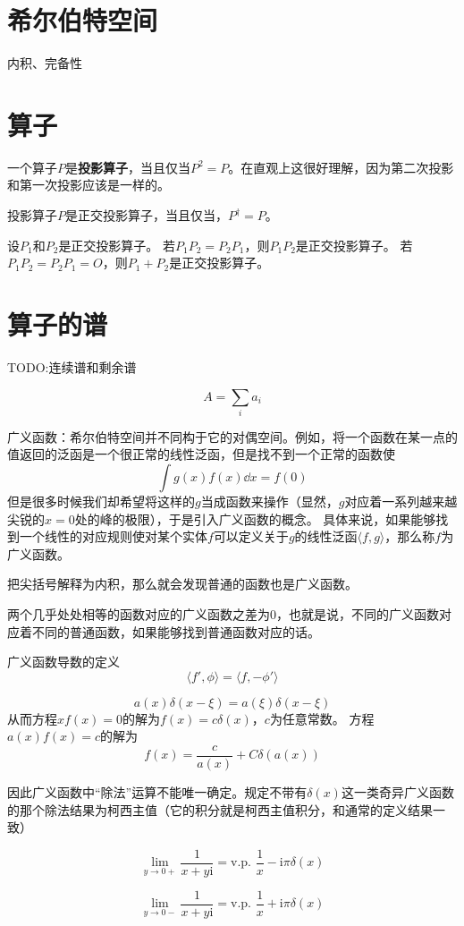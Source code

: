 \documentclass[UTF8, a4paper]{ctexart}
\newcommand*{\ii}{\mathrm{i}}
\begin{document}
\section{希尔伯特空间}

内积、完备性

\section{算子}

一个算子$P$是\textbf{投影算子}，当且仅当$P^2 = P$。在直观上这很好理解，因为第二次投影和第一次投影应该是一样的。

投影算子$P$是正交投影算子，当且仅当，$P^\dagger=P$。

设$P_1$和$P_2$是正交投影算子。
若$P_1 P_2 = P_2 P_1$，则$P_1 P_2$是正交投影算子。
若$P_1 P_2 = P_2 P_1 = O$，则$P_1 + P_2$是正交投影算子。


\section{算子的谱}

TODO:连续谱和剩余谱

\[
    A = \sum_i a_i 
\]

广义函数：希尔伯特空间并不同构于它的对偶空间。例如，将一个函数在某一点的值返回的泛函是一个很正常的线性泛函，但是找不到一个正常的函数使
\[
    \int g(x) f(x) \dd x = f(0) 
\]
但是很多时候我们却希望将这样的$g$当成函数来操作（显然，$g$对应着一系列越来越尖锐的$x=0$处的峰的极限），于是引入广义函数的概念。
具体来说，如果能够找到一个线性的对应规则使对某个实体$f$可以定义关于$g$的线性泛函$\langle f, g \rangle$，那么称$f$为广义函数。

把尖括号解释为内积，那么就会发现普通的函数也是广义函数。

两个几乎处处相等的函数对应的广义函数之差为0，也就是说，不同的广义函数对应着不同的普通函数，如果能够找到普通函数对应的话。

广义函数导数的定义
\[
    \langle f', \phi \rangle = \langle f, -\phi' \rangle
\]

\[
    a(x) \delta(x - \xi) = a(\xi) \delta(x - \xi)
\]
从而方程$xf(x)=0$的解为$f(x)=c\delta(x)$，$c$为任意常数。
方程$a(x)f(x)=c$的解为
\[
    f(x) = \frac{c}{a(x)} + C \delta(a(x))
\]

因此广义函数中“除法”运算不能唯一确定。规定不带有$\delta(x)$这一类奇异广义函数的那个除法结果为柯西主值（它的积分就是柯西主值积分，和通常的定义结果一致）

\[
    \lim_{y \to 0+} \frac{1}{x + y \ii} = \text{v.p. } \frac{1}{x} - \ii \pi \delta(x)
\]

\[
    \lim_{y \to 0-} \frac{1}{x + y \ii} = \text{v.p. } \frac{1}{x} + \ii \pi \delta(x)
\]
\end{document}
